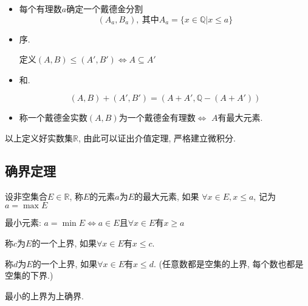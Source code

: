 \begin{itemize}
    \item 每个有理数$a$确定一个戴德金分割
    \begin{equation}
      (A_a,B_a), \ \text{其中} A_a = \{x\in \mathbb{Q} | x \le a\}
    \end{equation}

    \item 序.

    定义$(A,B) \le  (A',B') \iff A \subseteq A'$
    
    \item 和.
    
    \begin{equation}
      (A,B) + (A',B') = (A+A', \mathbb{Q}-(A+A'))
    \end{equation}

    \item 称一个戴德金实数$(A,B)$为一个戴德金有理数$\iff$ $A$有最大元素.
\end{itemize}

以上定义好实数集$\mathbb{R}$, 由此可以证出介值定理, 严格建立微积分.

\subsection{确界定理}
\begin{definition}
    设非空集合$E\in \mathbb{R}$, 称$E$的元素$a$为$E$的最大元素, 如果
    $\forall x\in E, x\le a$, 记为 $a = \max E$

    最小元素:
    $a =\min E \iff a \in E \text{且} \forall x\in E \text{有} x\ge a$
\end{definition}

\begin{definition}
    称$c$为$E$的一个上界, 如果$\forall x\in E\text{有}x\le c$.

    称$d$为$E$的一个上界, 如果$\forall x\in E\text{有}x\le d$.
    (任意数都是空集的上界, 每个数也都是空集的下界.)

    最小的上界为上确界.
\end{definition}

